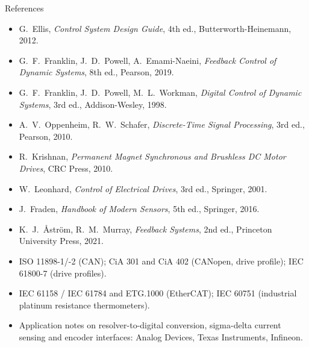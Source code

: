\documentclass[aspectratio=169,10pt]{beamer}
\begin{document}
\begin{frame}{References}
\scriptsize
\begin{itemize}
\item G.~Ellis, \emph{Control System Design Guide}, 4th ed., Butterworth-Heinemann, 2012.
\item G.~F.~Franklin, J.~D.~Powell, A.~Emami-Naeini, \emph{Feedback Control of Dynamic Systems}, 8th ed., Pearson, 2019.
\item G.~F.~Franklin, J.~D.~Powell, M.~L.~Workman, \emph{Digital Control of Dynamic Systems}, 3rd ed., Addison-Wesley, 1998.
\item A.~V.~Oppenheim, R.~W.~Schafer, \emph{Discrete-Time Signal Processing}, 3rd ed., Pearson, 2010.
\item R.~Krishnan, \emph{Permanent Magnet Synchronous and Brushless DC Motor Drives}, CRC Press, 2010.
\item W.~Leonhard, \emph{Control of Electrical Drives}, 3rd ed., Springer, 2001.
\item J.~Fraden, \emph{Handbook of Modern Sensors}, 5th ed., Springer, 2016.
\item K.~J.~\AA{}str\"om, R.~M.~Murray, \emph{Feedback Systems}, 2nd ed., Princeton University Press, 2021.
\item ISO 11898-1/-2 (CAN); CiA 301 and CiA 402 (CANopen, drive profile); IEC 61800-7 (drive profiles).
\item IEC 61158 / IEC 61784 and ETG.1000 (EtherCAT); IEC 60751 (industrial platinum resistance thermometers).
\item Application notes on resolver-to-digital conversion, sigma-delta current sensing and encoder interfaces: Analog Devices, Texas Instruments, Infineon.
\end{itemize}
\end{frame}
\end{document}
